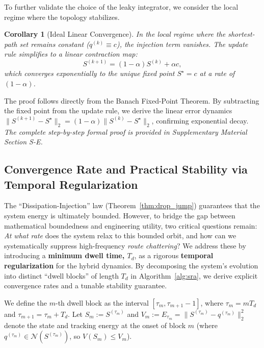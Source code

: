 \documentclass[journal]{IEEEtran}
\theoremstyle{plain}
\newtheorem{corollary}{Corollary}
\theoremstyle{definition}
\newcommand{\rev}[1]{{\color{blue}#1}}
\begin{document}
To further validate the choice of the leaky integrator, we consider the local regime where the topology stabilizes.

\begin{corollary}[Ideal Linear Convergence]
\label{cor:local_convergence}
In the local regime where the shortest-path set remains constant ($q^{(k)} \equiv c$), the injection term vanishes. The update rule simplifies to a linear contraction map:
\begin{equation}\label{eq:linear_update}
S^{(k+1)}=(1-\alpha)S^{(k)}+\alpha c,
\end{equation}
which converges exponentially to the unique fixed point $S^\star=c$ at a rate of $(1-\alpha)$.
\end{corollary}
\begin{IEEEproof}
The proof follows directly from the Banach Fixed-Point Theorem. By subtracting the fixed point from the update rule, we derive the linear error dynamics $\|S^{(k+1)}-S^\star\|_2 = (1-\alpha)\|S^{(k)}-S^\star\|_2$, confirming exponential decay. \textit{The complete step-by-step formal proof is provided in Supplementary Material Section S-E.}
\end{IEEEproof}

\subsection{Convergence Rate and Practical Stability via Temporal Regularization}
\label{subsec:practical_stability_rate}

The ``Dissipation-Injection'' law (Theorem~\ref{thm:drop_jump}) guarantees that the system energy is ultimately bounded. 
However, to bridge the gap between mathematical boundedness and engineering utility, two critical questions remain: \textit{At what rate} does the system relax to this bounded orbit, and how can we systematically suppress high-frequency \textit{route chattering}?
We address these by introducing a \textbf{minimum dwell time, $T_d$}, as a rigorous \textbf{temporal regularization} for the hybrid dynamics.
By decomposing the system's evolution into distinct ``dwell blocks'' of length $T_d$ in Algorithm~\ref{alg:sra}, we derive explicit convergence rates and a tunable stability guarantee.

We define the $m$-th dwell block as the interval $[\tau_m, \tau_{m+1}-1]$, where $\tau_m = m T_d$ and $\tau_{m+1} = \tau_m + T_d$. 
\rev{Let $S_m := S^{(\tau_m)}$ and $V_m := E_{\tau_m} = \|S^{(\tau_m)} - q^{(\tau_m)}\|_2^2$ denote the state and tracking energy at the onset of block $m$ (where $q^{(\tau_m)} \in \mathcal{N}(S^{(\tau_m)})$, so $V(S_m) \le V_m$).}
\end{document}
